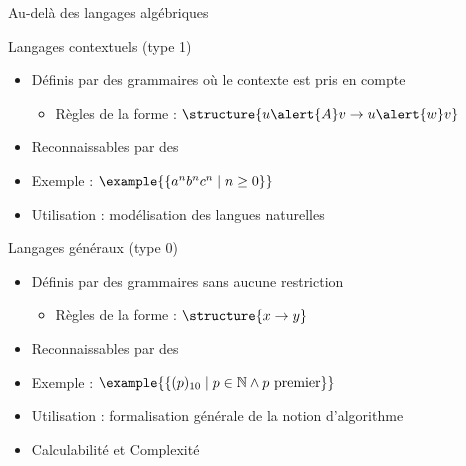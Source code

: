 
\begingroup

\begin{frame}{Au-delà des langages algébriques}

  \begin{block}{Langages contextuels (type 1)}
    \begin{itemize}
      \item Définis par des grammaires où le contexte est pris en compte
        \begin{itemize}
        \item Règles de la forme : $\structure{u \alert{A} v \rightarrow u \alert{w} v}$
        \end{itemize}
      \item Reconnaissables par des 
      \item Exemple : $\example{\{ a^n b^n c^n \mid n \geq 0 \}}$
      \item Utilisation : modélisation des langues naturelles
    \end{itemize}
  \end{block}

  \begin{block}{Langages généraux (type 0)}
    \begin{itemize}
      \item Définis par des grammaires sans aucune restriction
        \begin{itemize}
        \item Règles de la forme : $\structure{x \rightarrow y}$
        \end{itemize}
      \item Reconnaissables par des 
      \item Exemple : $\example{\left\{ (p)_{10} \mid p\in \mathbb{N} \land p \text{ premier} \right\}}$
      \item Utilisation : formalisation générale de la notion d’algorithme
      \item {} \alert{Calculabilité et Complexité}
    \end{itemize}
  \end{block}

\end{frame}

\endgroup
